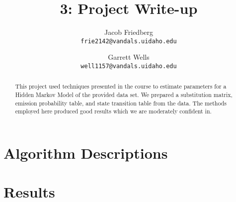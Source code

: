 \documentclass{article}
\title{3: Project Write-up}
\author{
Jacob Friedberg \\
\texttt{frie2142@vandals.uidaho.edu}
\and
Garrett Wells \\
\texttt{well1157@vandals.uidaho.edu}
}
\begin{document}
\maketitle
\begin{abstract}
    This project used techniques presented in the course to estimate parameters for a Hidden Markov Model of the provided data set. We prepared a substitution matrix, emission probability table, and state transition table from the data. The methods employed here produced good results which we are moderately confident in.
\end{abstract}

\section{Algorithm Descriptions}


\section{Results}
\end{document}
